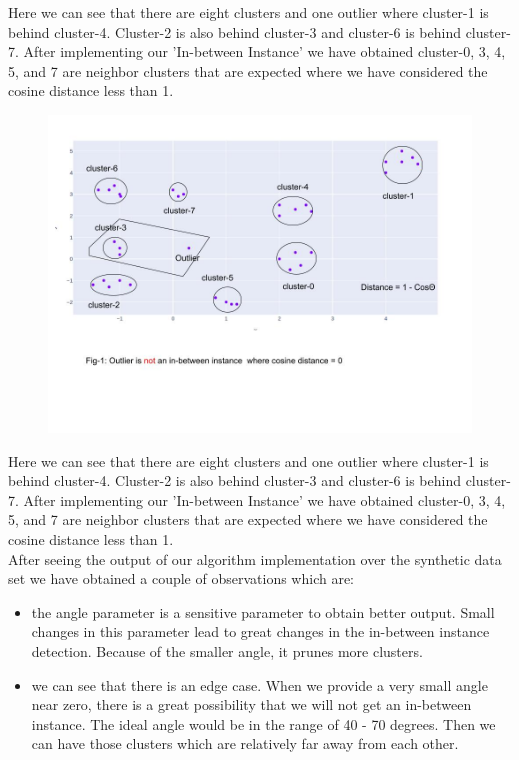 \documentclass[11pt]{article}
\theoremstyle{definition}
\begin{document}
\noindent Here we can see that there are eight clusters and one outlier where cluster-1 is behind cluster-4. Cluster-2 is also behind cluster-3 and cluster-6 is behind cluster-7. After implementing our 'In-between Instance' we have obtained cluster-0, 3, 4, 5, and 7  are neighbor clusters that are expected where we have considered the cosine distance less than 1.

\begin{figure}[H]
\centering
\includegraphics[scale=.5]{images/_ angle-.0.jpg}\\
\end{figure}
\noindent Here we can see that there are eight clusters and one outlier where cluster-1 is behind cluster-4. Cluster-2 is also behind cluster-3 and cluster-6 is behind cluster-7. After implementing our 'In-between Instance' we have obtained cluster-0, 3, 4, 5, and 7  are neighbor clusters that are expected where we have considered the cosine distance less than 1.\\
After seeing the output of our  algorithm implementation over the synthetic data set we have obtained a couple of observations which are:

\begin{itemize}
    \item the angle parameter is a sensitive parameter to obtain better output. Small changes in this parameter lead to great changes in the in-between instance detection. Because of the smaller angle, it prunes more clusters.
    \item we can see that there is an edge case. When we provide a very small angle near zero, there is a great possibility that we will not get an in-between instance. The ideal angle would be in the range of 40 - 70 degrees. Then we can have those clusters which are relatively far away from each other.
\end{itemize}
\end{document}
